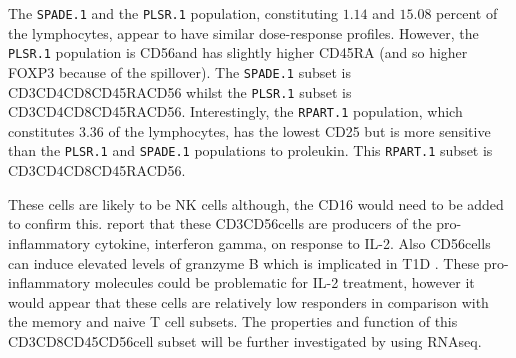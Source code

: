 The \texttt{SPADE.1} and the \texttt{PLSR.1} population, constituting $1.14$ and $15.08$ percent of the lymphocytes, appear to have similar dose-response profiles.
However, the \texttt{PLSR.1} population is CD56\negative and has slightly higher CD45RA (and so higher FOXP3 because of the spillover).
The \texttt{SPADE.1} subset is CD3\positive CD4\negative CD8\positive CD45RA\positive CD56\positive
whilst the \texttt{PLSR.1} subset is CD3\positive CD4\negative CD8\positive CD45RA\high CD56\negative.
Interestingly, the \texttt{RPART.1} population, which constitutes 3.36 of the lymphocytes, has the lowest CD25 but is more sensitive than the \texttt{PLSR.1} and \texttt{SPADE.1} populations to proleukin.  
This \texttt{RPART.1} subset is CD3\negative CD4\negative CD8\negative CD45RA\positive CD56\positive.

These  cells are likely to be NK cells although, the CD16 would need to be added to confirm this.
\citet{Ortaldo:1992tr} report that these CD3\negative CD56\positive cells are producers of the pro-inflammatory cytokine, interferon gamma, on response to IL-2.
Also CD56\positive cells can induce elevated levels of granzyme B which is implicated in \gls{T1D} \citep{Thomas:2010cy}.
These pro-inflammatory molecules could be problematic for IL-2 treatment, however it would appear that these cells are relatively low responders in comparison with the memory and naive T cell subsets.
The properties and function of this CD3\negative CD8\negative CD45\positive CD56\positive cell subset will be further investigated by  using RNAseq.


